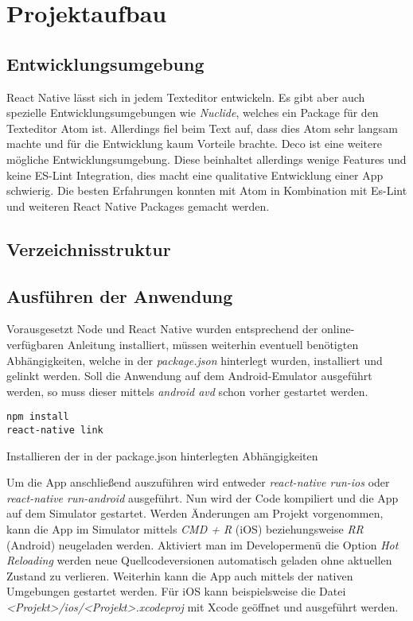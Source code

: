 \section{Projektaufbau}

\subsection{Entwicklungsumgebung}
React Native lässt sich in jedem Texteditor entwickeln. Es gibt aber auch spezielle Entwicklungsumgebungen wie \textit{Nuclide}, welches ein Package für den Texteditor Atom ist. Allerdings fiel beim Text auf, dass dies Atom sehr langsam machte und für die Entwicklung kaum Vorteile brachte. Deco ist eine weitere mögliche Entwicklungsumgebung. Diese beinhaltet allerdings wenige Features und keine ES-Lint Integration, dies macht eine qualitative Entwicklung einer App schwierig. Die besten Erfahrungen konnten mit Atom in Kombination mit Es-Lint und weiteren React Native Packages gemacht werden. 

\subsection{Verzeichnisstruktur}

\subsection{Ausführen der Anwendung}
Vorausgesetzt Node und React Native wurden entsprechend der online-verfügbaren Anleitung installiert, müssen weiterhin eventuell benötigten Abhängigkeiten, welche in der \textit{package.json} hinterlegt wurden, installiert und gelinkt werden. Soll die Anwendung auf dem Android-Emulator ausgeführt werden, so muss dieser mittels \textit{android avd} schon vorher gestartet werden.
\begin{listing}[H]
    \begin{verbatim}
npm install
react-native link
    \end{verbatim}
    \caption{Installieren der in der package.json hinterlegten Abhängigkeiten}
    \label{lst:install_dependencies}
\end{listing}

Um die App anschließend auszuführen wird entweder \textit{react-native run-ios} oder \textit{react-native run-android} ausgeführt. Nun wird der Code kompiliert und die App auf dem Simulator gestartet. Werden Änderungen am Projekt vorgenommen, kann die App im Simulator mittels \textit{CMD + R} (iOS) beziehungsweise \textit{RR} (Android) neugeladen werden. Aktiviert man im Developermenü die Option \textit{Hot Reloading} werden neue Quellcodeversionen automatisch geladen ohne aktuellen Zustand zu verlieren. Weiterhin kann die App auch mittels der nativen Umgebungen gestartet werden. Für iOS kann beispielsweise die Datei \textit{<Projekt>/ios/<Projekt>.xcodeproj} mit Xcode geöffnet und ausgeführt werden.

